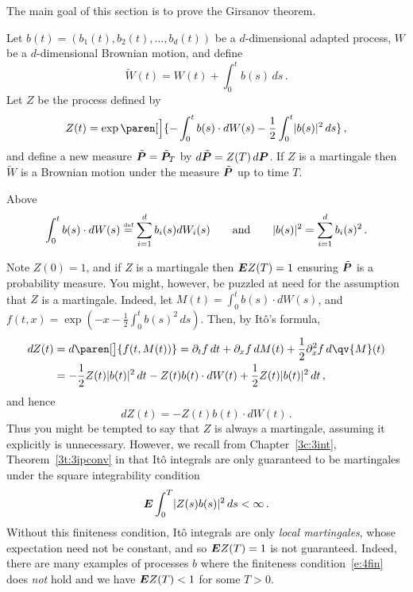 The main goal of this section is to prove the Girsanov theorem.
\begin{theorem}\label{t:4girsanov}
  Let $b(t) = (b_1(t), b_2(t), \dots, b_d(t))$ be a $d$-dimensional adapted process, $W$ be a $d$-dimensional Brownian motion, and define
  \begin{equation*}
    \tilde W(t) = W(t) + \int_0^t b(s) \, ds\,.
  \end{equation*}
  Let $Z$ be the process defined by
  \begin{equation*}
    Z(t) = \exp\paren[\Big]{ -\int_0^t b(s) \cdot dW(s) - \frac{1}{2}\int_0^t \abs{b(s)}^2 \, ds}\,,
  \end{equation*}
  and define a new measure $\tilde\P = \tilde\P_T$ by $d\tilde\P = Z(T) \, d\P$.
  If $Z$ is a martingale then $\tilde W$ is a Brownian motion under the measure $\tilde \P$ up to time $T$.
\end{theorem}
\begin{remark}
  Above
  \begin{equation*}
    \int_0^t b(s) \cdot dW(s) \defeq \sum_{i=1}^{d} b_i(s) dW_i(s)
    \qquad\text{and}\qquad
    \abs{b(s)}^2 = \sum_{i=1}^{d} b_i(s)^2\,.
  \end{equation*}
\end{remark}
\begin{remark}
  Note $Z(0) = 1$, and if $Z$ is a martingale then $\E Z(T) = 1$ ensuring $\tilde\P$ is a probability measure.
  You might, however, be puzzled at need for the assumption that $Z$ is a martingale.
  Indeed, let $M(t) = \int_0^t b(s) \cdot dW(s)$, and $f(t, x) = \exp(-x - \frac{1}{2} \int_0^t b(s)^2 \, ds )$.
  Then, by It\^o's formula,
  \begin{align*}
    dZ(t)
      &= d\paren[\big]{ f(t, M(t)) }
      = \partial_t f \, dt + \partial_x f \, dM(t)  + \frac{1}{2} \partial_x^2 f \, d\qv{M}(t)
    \\
      &= -\frac{1}{2} Z(t) \abs{b(t)}^2 \, dt
	-Z(t) b(t) \cdot dW(t) 
	+ \frac{1}{2} Z(t) \abs{b(t)}^2 \, dt\,,
  \end{align*}
  and hence
  \begin{equation}\label{e:4dz}
      dZ(t) = -Z(t) b(t) \cdot dW(t)\,.
  \end{equation}
  Thus you might be tempted to say that $Z$ is always a martingale, assuming it explicitly is unnecessary.
  However, we recall from Chapter~\ref{3c:3int}, Theorem~\ref{3t:3ipconv} in that It\^o integrals are only guaranteed to be martingales under the square integrability condition
  \begin{equation}\label{e:4fin}
    \E \int_0^T \abs{Z(s) b(s)}^2 \, ds < \infty\,.
  \end{equation}
  Without this finiteness condition, It\^o integrals are only \emph{local martingales}, whose expectation need not be constant, and so $\E Z(T) = 1$ is not guaranteed.
  Indeed, there are many examples of processes $b$ where the finiteness condition~\eqref{e:4fin} does \emph{not} hold and we have $\E Z(T) < 1$ for some $T > 0$.
\end{remark}

